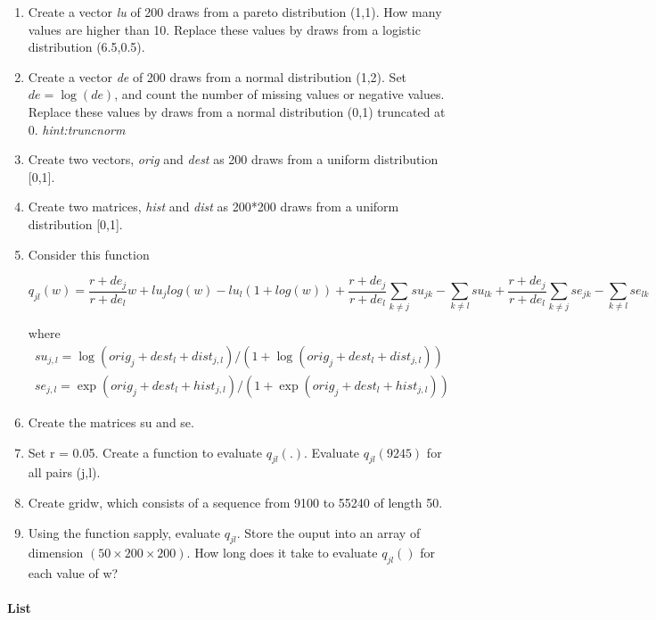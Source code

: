 \documentclass[11pt,a4paper]{article}
\newcommand{\1}{\mathbb{1}}
\begin{document}
\begin{Exercise}[title=Advanced indexing]
\begin{enumerate}
\item Create a vector \emph{lu} of 200 draws from a pareto distribution (1,1). How many values are higher than 10. Replace these values by draws from a logistic distribution (6.5,0.5). 
\item Create a vector \emph{de} of 200 draws from a normal distribution (1,2). Set $de = \log(de)$, and count the number of missing values or negative values. Replace these values by draws from a normal distribution (0,1) truncated at 0. \emph{hint:truncnorm}
\item Create two vectors, \emph{orig} and \emph{dest} as 200 draws from a uniform distribution [0,1]. 
\item Create two matrices, \emph{hist} and \emph{dist} as 200*200 draws from a uniform distribution [0,1]. 
\item Consider this function

\begin{equation}
q_{jl}(w) =  \frac{r+de_j}{r+de_l} w + lu_j log(w) - lu_l (1+log(w)) + \frac{r+de_j}{r+de_l} \sum_{k \neq j} su_{jk} - \sum_{k \neq l} su_{lk} + \frac{r+de_j}{r+de_l} \sum_{k \neq j} se_{jk} - \sum_{k \neq l} se_{lk}
\end{equation}

where 
\begin{eqnarray}
su_{j,l} = \log(orig_j + dest_l + dist_{j,l})/(1+\log(orig_j + dest_l + dist_{j,l}))\\
se_{j,l} = \exp(orig_j + dest_l + hist_{j,l})/(1+\exp(orig_j + dest_l + hist_{j,l}))
\end{eqnarray}
\item Create the matrices su and se.
\item Set r = 0.05. Create a function to evaluate $q_{jl}(.)$. Evaluate $q_{jl}(9245)$ for all pairs (j,l). 
\item Create gridw, which consists of a sequence from 9100 to 55240 of length 50. 
\item Using the function sapply, evaluate $q_{jl}$. Store the ouput into an array of dimension $(50\times 200 \times 200)$. How long does it take to evaluate $q_{jl}()$ for each value of w? 
\end{enumerate}
\end{Exercise}


\paragraph{List}
\end{document}
